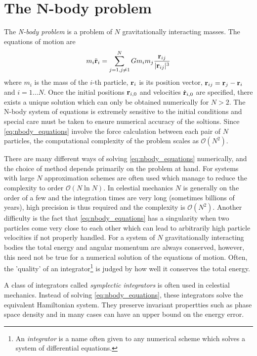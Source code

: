 \documentclass[ twoside,openright,titlepage,numbers=noenddot,headinclude,%
                footinclude=true,cleardoublepage=empty,abstractoff, %
                BCOR=5mm,paper=a4,fontsize=11pt,%
                american,%
                ]{scrreprt}
\begin{document}
\section{The N-body problem}
\label{sec:The N-body problem}
The \emph{N-body problem} is a problem of $N$ gravitationally interacting
masses. The equations of motion are
\begin{equation}
    m_i\ddot{\boldsymbol{\mathbf{r}}}_i=\sum_{j=1,j\neq 1}^NGm_im_j \frac{\boldsymbol{\mathbf{r}}_{ij}}
    {\lvert \boldsymbol{\mathbf{r}}_{ij}\rvert^3} 
    \label{eq:nbody_equations}
\end{equation}
where $m_i$ is the mass of the $i$-th particle, $\boldsymbol{\mathbf{r}}_i$ is its 
position vector, $\boldsymbol{\mathbf{r}}_{ij}=\boldsymbol{\mathbf{r}}_j-\boldsymbol{\mathbf{r}}_i$ and $i=1\dots N$.
Once the initial positions $\boldsymbol{\mathbf{r}}_{i,0}$ and velocities $\dot{\boldsymbol{\mathbf{r}}}_{i,0}$
are specified, there exists a unique solution which can only be obtained
numerically for $N>2$. The N-body system of equations is extremely sensitive
to the initial conditions and special care must be taken to ensure numerical
accuracy of the soltions. Since \cref{eq:nbody_equations} involve the force
calculation between each pair of $N$ particles, the computational complexity
of the problem scales as $\mathcal{O}(N^2)$.

There are many different ways of solving \cref{eq:nbody_equations} numerically,
and the choice of method depends primarily on the problem at hand. For systems
with large $N$
approximation schemes are often used which manage to reduce the complexity
to order $\mathcal{O}(N\ln N)$. In celestial mechanics $N$ is generally on
the order of a few and the integration times are very long (sometimes 
billions of years), high precision is thus required and the complexity is 
$\mathcal{O}(N^2)$. Another difficulty is the fact that \cref{eq:nbody_equations}
has a singularity when two particles come very close to each other which
can lead to arbitrarily high particle velocities if not properly handled.
For a system of $N$ gravitationally interacting bodies the total energy 
and angular momentum are always conserved, however, this need not be true 
for a numerical solution of the equations of motion. Often, the 'quality'
of an integrator\footnote{An \emph{integrator} is a name often given to
any numerical scheme which solves a system of differential equations.}
is judged by how well it conserves the total energy.

A class of integrators called \emph{symplectic integrators} 
\citep{vogelaere,ruth,feng} is often used
in celestial mechanics. Instead of solving \cref{eq:nbody_equations}, these
integrators solve the equivalent Hamiltonian system. They preserve
invariant propertties such as phase space density and in many cases
can have an upper bound on the energy error.
\end{document}
